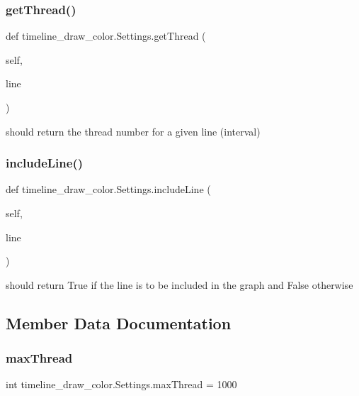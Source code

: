 \subsubsection{\texorpdfstring{get\+Thread()}{getThread()}}
{\footnotesize\ttfamily def timeline\+\_\+draw\+\_\+color.\+Settings.\+get\+Thread (\begin{DoxyParamCaption}\item[{}]{self,  }\item[{}]{line }\end{DoxyParamCaption})}



should return the thread number for a given line (interval) 

\mbox{\label{classtimeline__draw__color_1_1Settings_abc0017e43efda88d737383cfbcfb402d}} 
\subsubsection{\texorpdfstring{include\+Line()}{includeLine()}}
{\footnotesize\ttfamily def timeline\+\_\+draw\+\_\+color.\+Settings.\+include\+Line (\begin{DoxyParamCaption}\item[{}]{self,  }\item[{}]{line }\end{DoxyParamCaption})}



should return True if the line is to be included in the graph and False otherwise 



\subsection{Member Data Documentation}
\mbox{\label{classtimeline__draw__color_1_1Settings_ae036d957c043e96fe8a7dfc658d66192}} 
\subsubsection{\texorpdfstring{max\+Thread}{maxThread}}
{\footnotesize\ttfamily int timeline\+\_\+draw\+\_\+color.\+Settings.\+max\+Thread = 1000\hspace{0.3cm}{\ttfamily [static]}}

